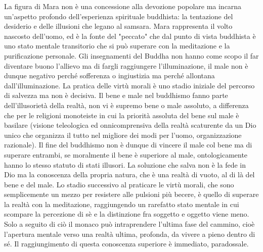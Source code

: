 \documentclass[10pt,a4paper]{report}
\begin{document}
La figura di Mara non è una concessione alla devozione popolare ma incarna un'aspetto profondo dell'esperienza spirituale buddhista: la tentazione del desiderio e delle illusioni che legano al samsara. Mara rappresenta il volto nascosto dell'uomo, ed è la fonte del "peccato" che dal punto di vista buddhista è uno stato mentale transitorio che si può superare con la meditazione e la purificazione personale. Gli insegnamenti del Buddha non hanno come scopo il far diventare buono l'allievo ma di fargli raggiungere l'illuminazione, il male non è dunque negativo perché sofferenza o ingiustizia ma perché allontana dall'illuminazione. La pratica delle virtù morali è uno stadio iniziale del percorso di salvezza ma non è decisiva. Il bene e male nel buddhismo fanno parte dell'illusorietà della realtà, non vi è supremo bene o male assoluto, a differenza che per le religioni monoteiste in cui la priorità assoluta del bene sul male è basilare (visione teleologica ed onnicomprensiva della realtà scaturente da un Dio unico che organizza il tutto nel migliore dei modi per l'uomo, organizzazione razionale). Il fine del buddhismo non è dunque di vincere il male col bene ma di superare entrambi, se moralmente il bene è superiore al male, ontologicamente hanno lo stesso statuto di stati illusori. La soluzione che salva non è la fede in Dio ma la conoscenza della propria natura, che è una realtà di vuoto, al di là del bene e del male. Lo stadio successivo al praticare le virtù morali, che sono semplicemente un mezzo per resistere alle pulsioni più becere, è quello di superare la realtà con la meditazione, raggiungendo un rarefatto stato mentale in cui scompare la percezione di sè e la distinzione fra soggetto e oggetto viene meno. Solo a seguito di ciò il monaco può intraprendere l'ultima fase del cammino, cioè l'apertura mentale verso una realtà ultima, profonda, da vivere a pieno dentro di sé. Il raggiungimento di questa conoscenza superiore è immediato, paradossale. 
\end{document}
